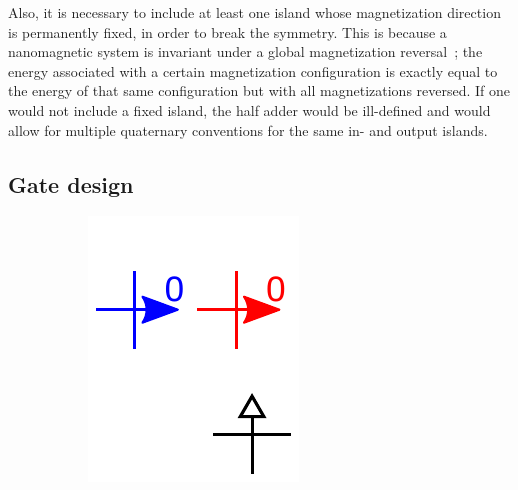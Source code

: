 \documentclass[11pt,a4paper,english,twoside]{article}
\begin{document}
Also, it is necessary to include at least one island whose magnetization direction is permanently fixed, in order to break the symmetry. This is because a nanomagnetic system is invariant under a global magnetization reversal~\cite{GYP-18}; the energy associated with a certain magnetization configuration is exactly equal to the energy of that same configuration but with all magnetizations reversed. If one would not include a fixed island, the half adder would be ill-defined and would allow for multiple quaternary conventions for the same in- and output islands. \par

\subsection{Gate design}
\begin{figure}[b!]
\centering
\begin{subfigure}[t]{0.23\textwidth}
    \includegraphics[width=\textwidth]{Figures/half_adder/schematic/000006_inputs_In1_0213/Input 0 deg arrowtext.pdf}

\end{subfigure}
\end{figure}
\end{document}
